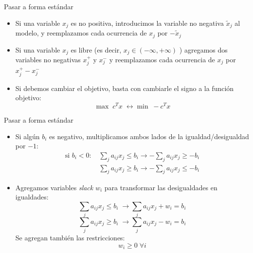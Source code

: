 \documentclass[10pt, aspectratio=169]{beamer}
\begin{document}
    \begin{frame}{Pasar a forma estándar}
        \begin{itemize}
            \item Si una variable $x_j$ es no positiva, introducimos la variable no negativa $\tilde{x}_j$ al modelo, y
            reemplazamos cada ocurrencia de $x_j$ por $-\tilde{x}_j$
            \item Si una variable $x_j$ es libre (es decir, $x_j\in(-\infty,+\infty)$
            ) agregamos dos variables no negativas $x_j^+$ y $x_j^-$  y reemplazamos cada ocurrencia de $x_j$ por
            $x_j^+ - x_j^-$
            \item Si debemos cambiar el objetivo, basta con cambiarle el signo a la función objetivo:
            \[ \max\; c^Tx \; \leftrightarrow \min\; -c^Tx \]

        \end{itemize}
    \end{frame}

    \begin{frame}{Pasar a forma estándar}
        \begin{itemize}
            \item Si algún $b_i$ es negativo, multiplicamos ambos lados de la igualdad/desigualdad por $-1$:
            \[\begin{array}{rl}
                  \text{si $b_i<0$: } & \displaystyle\sum_j a_{ij}x_j \leq b_i \rightarrow -\sum_j a_{ij}x_j \geq -b_i
                  \\
                  & \displaystyle\sum_j a_{ij}x_j \geq b_i \rightarrow -\sum_j a_{ij}x_j \leq -b_i
            \end{array}\]
            \item Agregamos variables \textit{slack} $w_i$ para transformar las desigualdades en igualdades:
            \[ \sum_j a_{ij}x_j \leq b_i \; \rightarrow \sum_j a_{ij}x_j + w_i = b_i \]
            \[ \sum_j a_{ij}x_j \geq b_i \; \rightarrow \sum_j a_{ij}x_j - w_i = b_i \]
            Se agregan también las restricciones:
            \[w_i\geq 0 \; \forall i\]
        \end{itemize}
    \end{frame}
\end{document}

